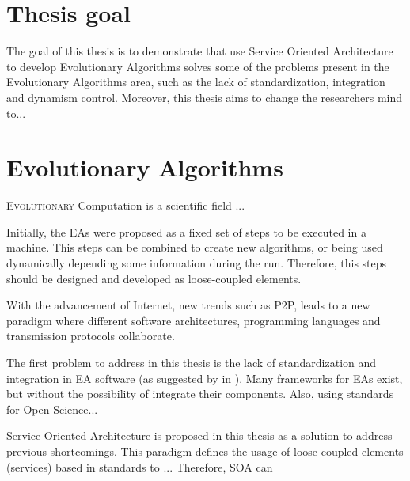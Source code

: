 \label{chap:introduction}
\minitoc\mtcskip
\vfill



\section{Thesis goal} %
The goal of this thesis is to demonstrate that use Service Oriented Architecture to develop Evolutionary Algorithms solves some of the problems present in the Evolutionary Algorithms area, such as the lack of standardization, integration and dynamism control. Moreover, this thesis aims to change the researchers mind to...

\section{Evolutionary Algorithms}
\label{sec:intro:eas}

\lettrine{E}{volutionary} Computation is a scientific field ...

Initially, the EAs were proposed as a fixed set of steps to be executed in a machine. This steps can be combined to create new algorithms, or being used dynamically depending some information during the run. Therefore, this steps should be designed and developed as loose-coupled elements.

With the advancement of Internet, new trends such as P2P, leads to a new paradigm where different software architectures, programming languages and transmission protocols collaborate. 

The first problem to address in this thesis is the lack of standardization and integration in EA software (as suggested by  in \cite{SURVEYMOFS}). Many frameworks for EAs exist, but without the possibility of integrate their components. Also, using standards for Open Science...

Service Oriented Architecture is proposed in this thesis as a solution to address previous shortcomings. This paradigm defines the usage of loose-coupled elements (services) based in standards to ... Therefore, SOA can


